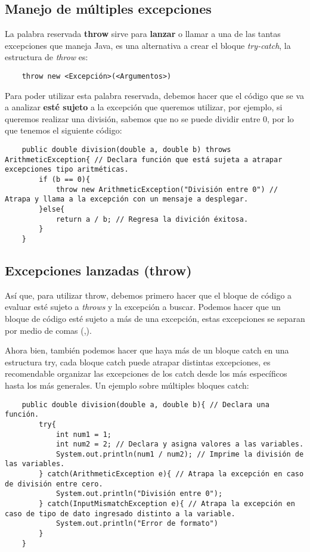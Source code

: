 \subsection{Manejo de múltiples excepciones}

La palabra reservada \textbf{throw} sirve para \textbf{lanzar} o llamar a una de las tantas excepciones que maneja Java, es una alternativa a crear el bloque \textit{try-catch}, la estructura de \textit{throw} es:
\begin{lstlisting}
    throw new <Excepción>(<Argumentos>)
\end{lstlisting}

Para poder utilizar esta palabra reservada, debemos hacer que el código que se va a analizar \textbf{esté sujeto} a la excepción que queremos utilizar, por ejemplo, si queremos realizar una división, sabemos que no se puede dividir entre 0, por lo que tenemos el siguiente código:
\begin{lstlisting}
    public double division(double a, double b) throws ArithmeticException{ // Declara función que está sujeta a atrapar excepciones tipo aritméticas.
        if (b == 0){
            throw new ArithmeticException("División entre 0") // Atrapa y llama a la excepción con un mensaje a desplegar.
        }else{
            return a / b; // Regresa la divición éxitosa.
        }
    }
\end{lstlisting}


\subsection{Excepciones lanzadas (throw)}

Así que, para utilizar throw, debemos primero hacer que el bloque de código a evaluar esté sujeto a \textit{throws} y la excepción a buscar. Podemos hacer que un bloque de código esté sujeto a más de una excepción, estas excepciones se separan por medio de comas (,).

Ahora bien, también podemos hacer que haya más de un bloque catch en una estructura try, cada bloque catch puede atrapar distintas excepciones, es recomendable organizar las excepciones de los catch desde los más específicos hasta los más generales. Un ejemplo sobre múltiples bloques catch:
\begin{lstlisting}
    public double division(double a, double b){ // Declara una función.
        try{
            int num1 = 1;
            int num2 = 2; // Declara y asigna valores a las variables.
            System.out.println(num1 / num2); // Imprime la división de las variables.
        } catch(ArithmeticException e){ // Atrapa la excepción en caso de división entre cero.
            System.out.println("División entre 0");
        } catch(InputMismatchException e){ // Atrapa la excepción en caso de tipo de dato ingresado distinto a la variable.
            System.out.println("Error de formato")
        }
    }
\end{lstlisting}


